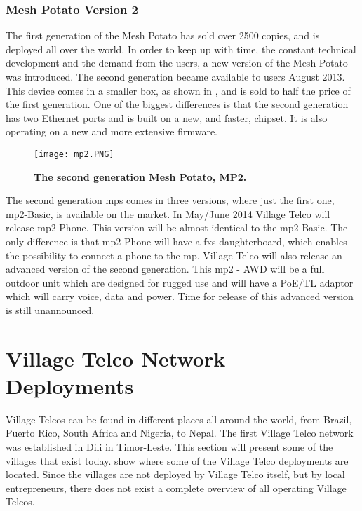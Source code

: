 \subsubsection{Mesh Potato Version 2}
The first generation of the Mesh Potato has sold over 2500 copies, and is deployed all over the world. In order to keep up with time, the constant technical development and the demand from the users, a new version of the Mesh Potato was introduced. The second generation became available to users August 2013. This device comes in a smaller box, as shown in , and is sold to half the price of the first generation. One of the biggest differences is that the second generation has two Ethernet ports and is built on a new, and faster, chipset. It is also operating on a new and more extensive firmware.

\begin{figure}[h!]
  \centering
      \texttt{[image: mp2.PNG]}
  \caption [MP2]{\textbf{The second generation Mesh Potato, MP2.}}
  \label{fig:MP02}
\end{figure}


The second generation \glspl{mp} comes in three versions, where just the first one, \gls{mp2}-Basic, is available on the market. In May/June 2014 Village Telco will release \gls{mp2}-Phone. This version will be almost identical to the \gls{mp2}-Basic. The only difference is that \gls{mp2}-Phone will have a \gls{fxs} daughterboard, which enables the possibility to connect a phone to the \gls{mp}. Village Telco will also release an advanced version of the second generation. This \gls{mp2} - AWD will be a full outdoor unit which are designed for rugged use and will have a PoE/TL adaptor which will carry voice, data and power. Time for release of this advanced version is still unannounced. 


\section{Village Telco Network Deployments} \label{sec:deployments}
Village Telcos can be found in different places all around the world, from Brazil, Puerto Rico, South Africa and Nigeria, to Nepal. The first Village Telco network was established in Dili in Timor-Leste. This section will present some of the villages that exist today.  show where some of the Village Telco deployments are located. Since the villages are not deployed by Village Telco itself, but by local entrepreneurs, there does not exist a complete overview of all operating Village Telcos. 


